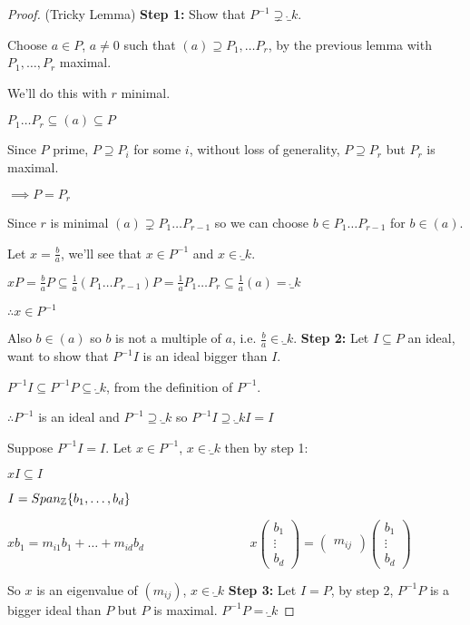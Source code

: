 \documentclass[11pt]{article}
\begin{document}
\begin{proof}
	(Tricky Lemma)
\spac
	\textbf{Step 1:} Show that $P^{-1} \supsetneq \ring_k$.

	Choose $a \in P$, $a \neq 0 $ such that $(a) \supseteq P_1, \dots P_r$, by the previous lemma with $P_1, \dots, P_r$ maximal.
\spa

	We'll do this with $r$ minimal.
	\spa

	$P_1 \dots P_r \subseteq (a) \subseteq P$
	\spa

	Since $P$ prime, $P \supseteq P_i$ for some $i$, without loss of generality, $P \supseteq P_r$ but $P_r$ is maximal.
\spa

	$\implies P= P_r$
	\spa

	Since $r$ is minimal $(a) \supsetneq P_1 \dots P_{r-1}$ so we can choose $b \in P_1 \dots P_{r-1}$ for $b \in (a) $.
	\spa
	
	Let $x = \frac{b}{a}$, we'll see that $x \in P^{-1}$ and $x \in \ring_k$.
	\spa

	$xP =\frac{b}{a}P \subseteq \frac{1}{a}(P_1\dots P_{r-1})P = \frac{1}{a}P_1 \dots P_r \subseteq \frac{1}{a}(a) = \ring_k$
	\spa

	$\therefore x \in P^{-1}$
	\spa

	Also $b \in (a) $ so $b$ is not a multiple of $a$, i.e. $\frac{b}{a} \in \ring_k$.
	\spac
	\textbf{Step 2: } Let $I \subseteq P$ an ideal, want to show that $P^{-1}I$ is an ideal bigger than $I$.
	\spa

	$P^{-1} I \subseteq P^{-1}P \subseteq \ring_k $, from the definition of $P^{-1}$.
	\spa

	$\therefore P^{-1} $ is an ideal and $P^{-1} \supseteq \ring_k$ so $P^{-1} I \supseteq \ring_k I = I$
	\spa

	Suppose $P^{-1} I =I$. Let $x \in P^{-1}$, $x \in \ring_k$ then by step 1:
	\spa

	$xI \subseteq I$
\spa

	$I = Span_{\mathbb{Z}}\{ b_1, \dots, b_d\}$
\spa

	$xb_1 = m_{i1}b_1 + \dots + m_{id}b_d  \hspace{100pt} x\begin{pmatrix}
		b_1\\
		\vdots\\
		b_d
	\end{pmatrix} = \begin{pmatrix}
		m_{ij}
	\end{pmatrix}
	\begin{pmatrix}
b_1\\
\vdots\\
b_d
	\end{pmatrix}
	$
\spa

So $x$ is an eigenvalue of $(m_{ij})$, $x \in \ring_k$ \lightning
\spac
\textbf{Step 3: } Let $I=P$, by step 2, $P^{-1}P$ is a bigger ideal than $P$ but $P$ is maximal.
$ P^{-1} P = \ring_k$



\end{proof}
\end{document}

